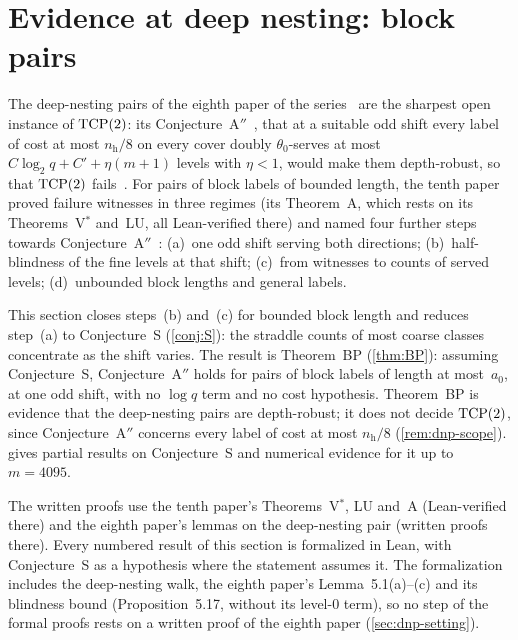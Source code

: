 \section{Evidence at deep nesting: block pairs}\label{sec:dnp}

The deep-nesting pairs of the eighth paper of the series~\cite[Section~2.5]{BoundedNesting2026} are the sharpest open
instance of $\mathrm{TCP}(2)$: its Conjecture~A$''$~\cite[Conjecture~5.24]{BoundedNesting2026}, that at a suitable odd shift every
label of cost at most $n_{\mathrm h}/8$ on every cover doubly $\theta_0$-serves at most $C\log_2q+C'+\eta(m+1)$ levels with
$\eta<1$, would make them depth-robust, so that $\mathrm{TCP}(2)$ fails~\cite[Corollary~5.26]{BoundedNesting2026}. For pairs of
block labels of bounded length, the tenth paper~\cite[Section~5]{DirectedReciprocity2026} proved failure witnesses in three
regimes (its Theorem~A, which rests on its Theorems~V$^*$ and~LU, all Lean-verified there) and named four further steps
towards Conjecture~A$''$~\cite[Remark~5.6]{DirectedReciprocity2026}: (a)~one odd shift serving both directions;
(b)~half-blindness of the fine levels at that shift; (c)~from witnesses to counts of served levels; (d)~unbounded block
lengths and general labels.

This section closes steps~(b) and~(c) for bounded block length and reduces step~(a) to Conjecture~S (\cref{conj:S}): the
straddle counts of most coarse classes concentrate as the shift varies. The result is Theorem~BP (\cref{thm:BP}): assuming
Conjecture~S, Conjecture~A$''$ holds for pairs of block labels of length at most~$a_0$, at one odd shift, with no
$\log q$ term and no cost hypothesis. Theorem~BP is evidence that the deep-nesting pairs are depth-robust; it does not
decide $\mathrm{TCP}(2)$, since Conjecture~A$''$ concerns every label of cost at most $n_{\mathrm h}/8$ (\cref{rem:dnp-scope}).
 gives partial results on Conjecture~S and numerical evidence for it up to $m=4095$.

The written proofs use the tenth paper's Theorems~V$^*$, LU and~A (Lean-verified there) and the eighth paper's lemmas on
the deep-nesting pair (written proofs there). Every numbered result of this section is formalized in Lean, with
Conjecture~S as a hypothesis where the statement assumes it. The formalization includes the deep-nesting walk, the
eighth paper's Lemma~5.1(a)--(c) and its blindness bound (Proposition~5.17, without its level-$0$ term), so no step of the
formal proofs rests on a written proof of the eighth paper (\cref{sec:dnp-setting}).

